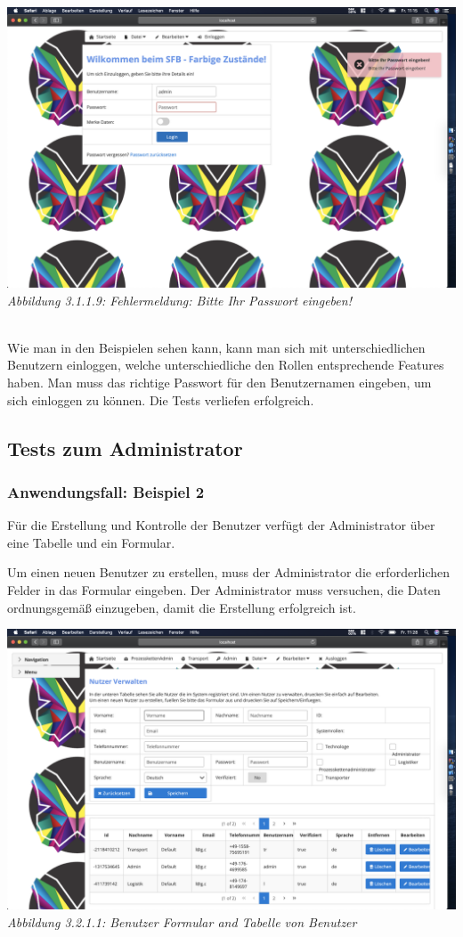 \documentclass[enabledeprecatedfontcommands,fontsize=12pt,paper=a4,twoside]{scrartcl}
\begin{document}
\hypertarget{sc3.1.1.9}{
\includegraphics[width=1\textwidth]{Screenshots/311BittePasswordEingeben.png}
\textit{Abbildung 3.1.1.9: Fehlermeldung: Bitte Ihr Passwort eingeben!}
} \\

Wie man in den Beispielen sehen kann, kann man sich mit unterschiedlichen Benutzern einloggen, welche unterschiedliche den Rollen entsprechende Features haben. Man muss das richtige Passwort für den Benutzernamen eingeben, um sich einloggen zu können. Die Tests verliefen erfolgreich. \\ 


\subsection{Tests zum Administrator}

\subsubsection{Anwendungsfall: Beispiel 2}
Für die Erstellung und Kontrolle der Benutzer verfügt der Administrator über eine Tabelle und ein Formular.

Um einen neuen Benutzer zu erstellen, muss der Administrator die erforderlichen Felder in das Formular eingeben. Der Administrator muss versuchen, die Daten ordnungsgemäß einzugeben, damit die Erstellung erfolgreich ist.

\hypertarget{sc3.1.2.1}{
\includegraphics[width=1\textwidth]{Screenshots/UserErzeugenFormular.png}
\textit{Abbildung 3.2.1.1: Benutzer Formular and Tabelle von Benutzer}
} \\
\end{document}
